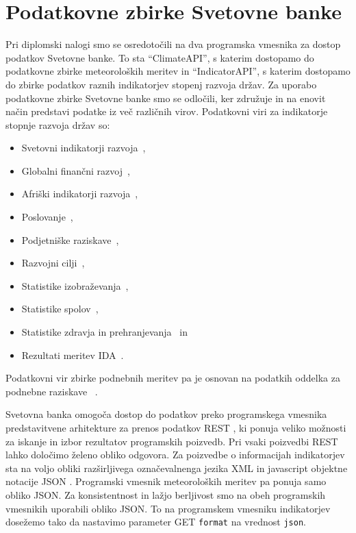 \chapter{Podatkovne zbirke Svetovne banke}

Pri diplomski nalogi smo se osredotočili na dva programska vmesnika za dostop 
podatkov Svetovne banke. To sta ``ClimateAPI'', s katerim dostopamo do 
podatkovne zbirke meteoroloških meritev in ``IndicatorAPI'', s katerim dostopamo do 
zbirke podatkov raznih indikatorjev stopenj razvoja držav.
Za uporabo podatkovne zbirke Svetovne banke smo se odločili, ker združuje in na
enovit način predstavi podatke iz več različnih virov. Podatkovni viri za 
indikatorje stopnje razvoja držav so:
\begin{itemize}  
  \item Svetovni indikatorji razvoja~\cite{world_dev_ind}, %
  \item Globalni finančni razvoj~\cite{glob_fin_dev},
  \item Afriški indikatorji razvoja~\cite{africa_dev_ind},
  \item Poslovanje~\cite{doing_buseness},
  \item Podjetniške raziskave~\cite{ent_surveys}, 
  \item Razvojni cilji~\cite{mil_dev_goals}, 
  \item Statistike izobraževanja~\cite{edu_stat}, 
  \item Statistike spolov~\cite{gen_stat},
  \item Statistike zdravja in prehranjevanja~\cite{health_pop_stat} in
  \item Rezultati meritev IDA~\cite{ida_res_mes_sys}.
\end{itemize}  

Podatkovni vir zbirke podnebnih meritev pa je osnovan na podatkih oddelka
za podnebne raziskave ~\cite{climate_data}.

Svetovna banka omogoča dostop do podatkov preko programskega vmesnika 
predstavitvene arhitekture za prenos podatkov REST 
, ki
ponuja veliko možnosti za iskanje in izbor rezultatov programskih poizvedb. Pri vsaki 
poizvedbi REST lahko določimo želeno obliko odgovora. Za poizvedbe o 
informacijah indikatorjev sta na voljo obliki 
razširljivega označevalnenga jezika XML  
in javascript objektne notacije JSON . Programski vmesnik 
meteoroloških meritev pa ponuja samo obliko JSON. Za konsistentnost in lažjo
berljivost smo na obeh programskih vmesnikih uporabili obliko JSON. To na
programskem vmesniku indikatorjev dosežemo tako da nastavimo parameter GET
\verb|format| na vrednost \verb|json|. 


